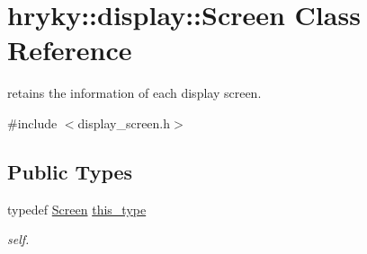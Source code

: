 \hypertarget{classhryky_1_1display_1_1_screen}{\section{hryky\-:\-:display\-:\-:Screen Class Reference}
\label{classhryky_1_1display_1_1_screen}
}


retains the information of each display screen.  




{\ttfamily \#include $<$display\-\_\-screen.\-h$>$}

\subsection*{Public Types}
\begin{DoxyCompactItemize}
\item 
\hypertarget{classhryky_1_1display_1_1_screen_a83363e4f31308e9b77bc99f86d659b7b}{typedef \hyperlink{classhryky_1_1display_1_1_screen}{Screen} \hyperlink{classhryky_1_1display_1_1_screen_a83363e4f31308e9b77bc99f86d659b7b}{this\-\_\-type}}\label{classhryky_1_1display_1_1_screen_a83363e4f31308e9b77bc99f86d659b7b}

\begin{DoxyCompactList}\small\item\em self. \end{DoxyCompactList}\end{DoxyCompactItemize}
